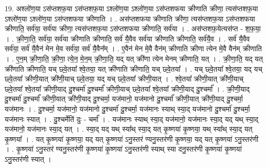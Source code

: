 \documentclass[17pt]{extarticle}
\begin{document}
19. अश्लो॑ण॒या ऽस॑प्तशफ॒या ऽस॑प्तशफ॒या ऽश्लो॑ण॒या ऽश्लो॑ण॒या ऽस॑प्तशफया क्रीणाति क्रीणा॒
त्यस॑प्तशफ॒या ऽश्लो॑ण॒या ऽश्लो॑ण॒या ऽस॑प्तशफया क्रीणाति । . अस॑प्तशफया क्रीणाति क्रीणा॒ त्यस॑प्तशफ॒या ऽस॑प्तशफया क्रीणाति॒ सर्व॑या॒ सर्व॑या क्रीणा॒ त्यस॑प्तशफ॒या ऽस॑प्तशफया क्रीणाति॒ सर्व॑या । . अस॑प्तशफ॒येत्यस॑प्त - श॒फ॒या॒ । . क्री॒णा॒ति॒ सर्व॑या॒ सर्व॑या क्रीणाति क्रीणाति॒ सर्व॑ यै॒वैव सर्व॑या क्रीणाति क्रीणाति॒ सर्व॑यै॒व । . सर्व॑ यै॒वैव सर्व॑या॒ सर्व॑ यै॒वैन॑ मेन मे॒व सर्व॑या॒ सर्व॑ यै॒वैन᳚म् । . ए॒वैन॑ मेन मे॒वै वैन॑म् क्रीणाति क्रीणा त्येन मे॒वै वैन॑म् क्रीणाति । . ए॒न॒म् क्री॒णा॒ति॒ क्री॒णा॒ त्ये॒न॒ मे॒न॒म् क्री॒णा॒ति॒ यद् यत् क्री॑णा त्येन मेनम् क्रीणाति॒ यत् । . क्री॒णा॒ति॒ यद् यत् क्री॑णाति क्रीणाति॒ यच् छ्वे॒तया᳚ श्वे॒तया॒ यत् क्री॑णाति क्रीणाति॒ यच् छ्वे॒तया᳚ । . यच् छ्वे॒तया᳚ श्वे॒तया॒ यद् यच् छ्वे॒तया᳚ क्रीणी॒यात् क्री॑णी॒याच् छ्वे॒तया॒ यद् यच् छ्वे॒तया᳚ क्रीणी॒यात् । . श्वे॒तया᳚ क्रीणी॒यात् क्री॑णी॒याच् छ्वे॒तया᳚ श्वे॒तया᳚ क्रीणी॒याद् दु॒श्चर्मा॑ दु॒श्चर्मा᳚ क्रीणी॒याच् छ्वे॒तया᳚ श्वे॒तया᳚ क्रीणी॒याद् दु॒श्चर्मा᳚ । . क्री॒णी॒याद् दु॒श्चर्मा॑ दु॒श्चर्मा᳚ क्रीणी॒यात् क्री॑णी॒याद् दु॒श्चर्मा॒ यज॑मानो॒ यज॑मानो दु॒श्चर्मा᳚ क्रीणी॒यात् क्री॑णी॒याद् दु॒श्चर्मा॒ यज॑मानः । . दु॒श्चर्मा॒ यज॑मानो॒ यज॑मानो दु॒श्चर्मा॑ दु॒श्चर्मा॒ यज॑मानः स्याथ् स्या॒द् यज॑मानो दु॒श्चर्मा॑ दु॒श्चर्मा॒ यज॑मानः स्यात् । . दु॒श्चर्मेति॑ दुः - चर्मा᳚ । . यज॑मानः स्याथ् स्या॒द् यज॑मानो॒ यज॑मानः स्या॒द् यद् यथ् स्या॒द् यज॑मानो॒ यज॑मानः स्या॒द् यत् । . स्या॒द् यद् यथ् स्या᳚थ् स्या॒द् यत् कृ॒ष्णया॑ कृ॒ष्णया॒ यथ् स्या᳚थ् स्या॒द् यत् कृ॒ष्णया᳚ । . यत् कृ॒ष्णया॑ कृ॒ष्णया॒ यद् यत् कृ॒ष्णया॑ ऽनु॒स्तर॑ ण्यनु॒स्तर॑णी कृ॒ष्णया॒ यद् यत् कृ॒ष्णया॑ ऽनु॒स्तर॑णी । . कृ॒ष्णया॑ ऽनु॒स्तर॑ ण्यनु॒स्तर॑णी कृ॒ष्णया॑ कृ॒ष्णया॑ ऽनु॒स्तर॑णी स्याथ् स्या दनु॒स्तर॑णी कृ॒ष्णया॑ कृ॒ष्णया॑ ऽनु॒स्तर॑णी स्यात् । \newline
\end{document}
